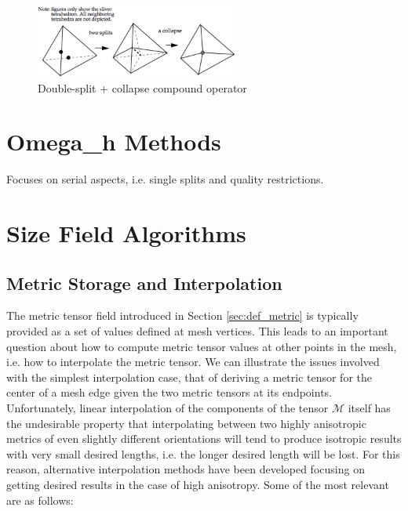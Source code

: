\begin{figure}
\begin{center}
\includegraphics[width=0.6\textwidth]{split_collapse.png}
\caption{Double-split + collapse compound operator
\cite{li2003mesh}}
\label{fig:compound}
\end{center}
\end{figure}

\section{Omega\_h Methods}
\label{sec:omega_h-adapt}

Focuses on serial aspects, i.e. single splits and
quality restrictions.

\section{Size Field Algorithms}
\label{sec:sf}

\subsection{Metric Storage and Interpolation}

The metric tensor field introduced in Section \ref{sec:def_metric}
is typically provided as a set of values defined at mesh vertices.
This leads to an important question about how to compute metric
tensor values at other points in the mesh, i.e. how to interpolate
the metric tensor.
We can illustrate the issues involved with the simplest interpolation
case, that of deriving a metric tensor for the center of a mesh
edge given the two metric tensors at its endpoints.
Unfortunately, linear interpolation of the components of the
tensor $\mathcal{M}$ itself has the undesirable property that
interpolating between two highly anisotropic metrics of even
slightly different orientations will tend to produce isotropic
results with very small desired lengths, i.e. the longer desired
length will be lost.
For this reason, alternative interpolation methods have been developed
focusing on getting desired results in the case of high anisotropy.
Some of the most relevant are as follows:

